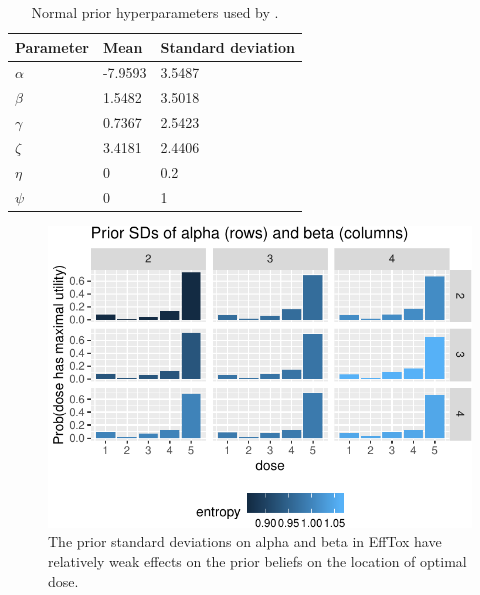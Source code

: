 \documentclass[article]{jss}
\begin{document}
\begin{table}
  \centering
  \begin{tabular}{| l | l | l |}
  \hline
   Parameter &  Mean &  Standard deviation \\ 
   \hline
   $\alpha$ & -7.9593 & 3.5487 \\
   $\beta$ & 1.5482 & 3.5018 \\
   $\gamma$ & 0.7367 & 2.5423 \\ 
   $\zeta$ & 3.4181 & 2.4406 \\
   $\eta$ & 0 & 0.2 \\
   $\psi$ & 0 & 1 \\
   \hline
  \end{tabular}
  \caption{Normal prior hyperparameters used by \citet{Thall2014}.}
  \label{tab:efftox_priors}
\end{table}

\begin{CodeChunk}
\begin{figure}

{\centering \includegraphics{trialr_files/figure-latex/efftox_prior_plot_1-1} 

}

\caption[The prior standard deviations on alpha and beta in EffTox have relatively weak effects on the prior beliefs on the location of optimal dose]{The prior standard deviations on alpha and beta in EffTox have relatively weak effects on the prior beliefs on the location of optimal dose.}\label{fig:efftox_prior_plot_1}
\end{figure}
\end{CodeChunk}
\end{document}
